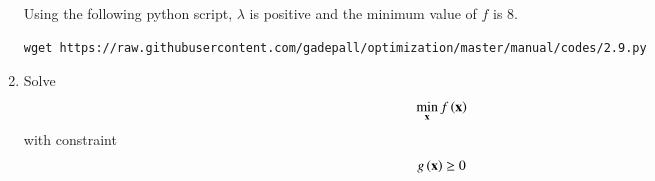 \documentclass[journal,12pt,twocolumn]{IEEEtran}
\renewcommand\thesection{\arabic{section}}
\begin{document}
\begin{enumerate}[label=\thesection.\arabic*,ref=\thesection.\theenumi]
%
\solution
Using the following python script, $\lambda$ is positive and the minimum value of $f$ is 8.
%	
\begin{lstlisting}
wget https://raw.githubusercontent.com/gadepall/optimization/master/manual/codes/2.9.py
\end{lstlisting}

%
%
\item
\label{ch2_prob_upper_cond}
Solve
	 \begin{align}
	\min_{\mathbf{x}} f\left(\mathbf{x}\right) 
	 \end{align}
	 with constraint
	 \begin{align}
	 g\left(\mathbf{x}\right) 
\geq 0 
	 \end{align}
	 

\end{enumerate}
\end{document}
